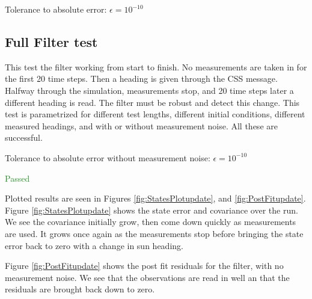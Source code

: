 \documentclass[]{BasiliskReportMemo}
\begin{document}
Tolerance to absolute error: $\epsilon = 10^{-10}$

\subsection{Full Filter test}

This test the filter working from start to finish. No measurements are taken in for the first 20 time steps. Then a heading is given through the CSS message. Halfway through the simulation, measurements stop, and 20 time steps later a different heading is read. The filter must be robust and detect this change. This test is parametrized for different test lengths, different initial conditions, different measured headings, and with or without measurement noise. All these are successful.

\vspace{0.2cm}
Tolerance to absolute error without measurement noise: $\epsilon = 10^{-10}$

\textcolor{ForestGreen}{Passed}

Plotted results are seen in Figures \ref{fig:StatesPlotupdate}, and \ref{fig:PostFitupdate}. Figure \ref{fig:StatesPlotupdate} shows the state error and covariance over the run. We see the covariance initially grow, then come down quickly as measurements are used. It grows once again as the measurements stop before bringing the state error back to zero with a change in sun heading. 

Figure \ref{fig:PostFitupdate} shows the post fit residuals for the filter, with no measurement noise. We see that the observations are read in well an that the residuals are brought back down to zero.





\end{document}
